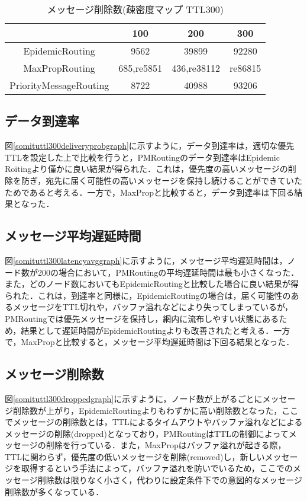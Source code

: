 \documentclass[11pt]{icsthesis}
\begin{document}
\begin{table}[H]
 \begin{center}
      \caption[]{メッセージ削除数(疎密度マップ TTL300)}
      \label{somituTtl300dropped}
      \begin{tabular}{|c|c|c|c|}
\hline
&100&200&300\\
\hline
EpidemicRouting&9562&39899&92280\\
\hline
MaxPropRouting&685,re5851&436,re38112&re86815\\
\hline
PriorityMessageRouting&8722&40988&93206\\
\hline
      \end{tabular}
    \end{center}
\end{table}

\subsection{データ到達率}
図\ref{somituttl300deliveryprobgraph}に示すように，データ到達率は，適切な優先TTLを設定した上で比較を行うと，PMRoutingのデータ到達率はEpidemic Roitingより僅かに良い結果が得られた．これは，優先度の高いメッセージの削除を防ぎ，宛先に届く可能性の高いメッセージを保持し続けることができていたためであると考える．一方で，MaxPropと比較すると，データ到達率は下回る結果となった．\\
\subsection{メッセージ平均遅延時間}
図\ref{somituttl300latencyavggraph}に示すように，メッセージ平均遅延時間は，ノード数が200の場合において，PMRoutingの平均遅延時間は最も小さくなった．また，どのノード数においてもEpidemicRoutingと比較した場合に良い結果が得られた．これは，到達率と同様に，EpidemicRoutingの場合は，届く可能性のあるメッセージをTTL切れや，バッファ溢れなどにより失ってしまっているが，PMRoutingでは優先メッセージを保持し，網内に流布しやすい状態にあるため，結果として遅延時間がEpidemicRoutingよりも改善されたと考える．一方で，MaxPropと比較すると，メッセージ平均遅延時間は下回る結果となった．\\

\subsection{メッセージ削除数}
図\ref{somituttl300droppedgraph}に示すように，ノード数が上がるごとにメッセージ削除数が上がり，EpidemicRoutingよりもわずかに高い削除数となった，ここでメッセージの削除数とは，TTLによるタイムアウトやバッファ溢れなどによるメッセージの削除(dropped)となっており，PMRoutingはTTLの制御によってメッセージの削除を行っている．また，MaxPropはバッファ溢れが起きる際，TTLに関わらず，優先度の低いメッセージを削除(removed)し，新しいメッセージを取得するという手法によって，バッファ溢れを防いでいるため，ここでのメッセージ削除数は限りなく小さく，代わりに設定条件下での意図的なメッセージ削除数が多くなっている．\\
\end{document}

